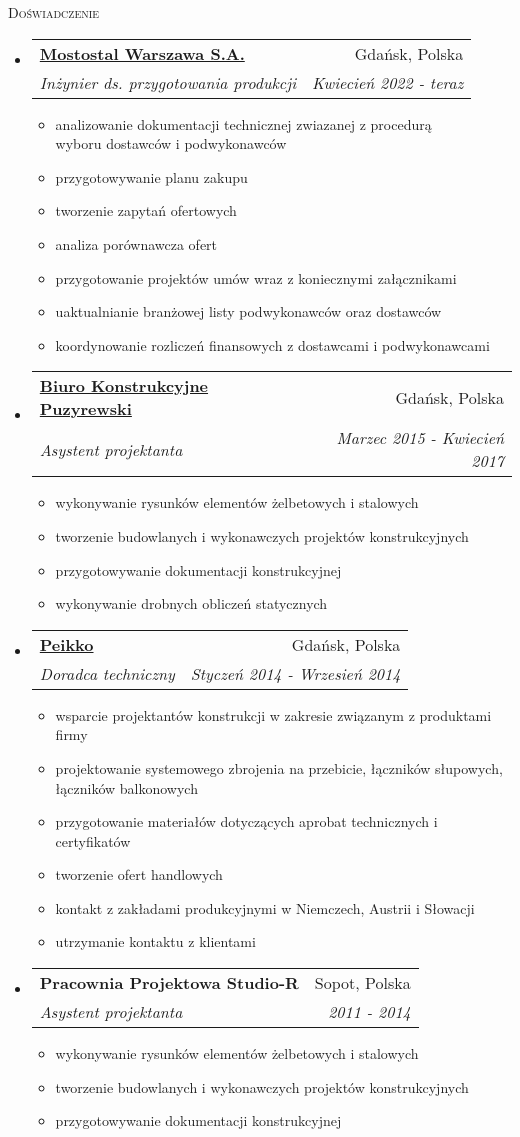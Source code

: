 \documentclass[letterpaper,11pt]{article}
\makeatletter
\newcommand{\resheading}[1]{
  \begin{tcolorbox}
  \textsc{#1}
  \end{tcolorbox}
}
\newcommand{\resitem}[1]{\item #1 \vspace{-2pt}}
\newcommand{\ressubheading}[4]{
\begin{tabular*}{6.5in}{l@{\extracolsep{\fill}}r}
		\textbf{#1} & #2 \\
		\textit{#3} & \textit{#4} \\
\end{tabular*}\vspace{-6pt}}
\makeatother
\begin{document}
\resheading{Doświadczenie}
\begin{itemize}

\item
  \ressubheading{\href{www.mostostal.waw.pl}{Mostostal Warszawa S.A.}}{Gdańsk, Polska}{Inżynier ds. przygotowania produkcji}{Kwiecień 2022 - teraz}
  \begin{itemize}
    \resitem{analizowanie dokumentacji technicznej zwiazanej z procedurą \\ wyboru dostawców i podwykonawców}
    \resitem{przygotowywanie planu zakupu}
    \resitem{tworzenie zapytań ofertowych}
    \resitem{analiza porównawcza ofert}
    \resitem{przygotowanie projektów umów wraz z koniecznymi załącznikami}
    \resitem{uaktualnianie branżowej listy podwykonawców oraz dostawców}
    \resitem{koordynowanie rozliczeń finansowych z dostawcami i podwykonawcami}
  \end{itemize}

\item
  \ressubheading{\href{www.puzyrewski.pl}{Biuro Konstrukcyjne Puzyrewski}}{Gdańsk, Polska}{Asystent projektanta}{Marzec 2015 - Kwiecień 2017}
  \begin{itemize}
    \resitem{wykonywanie rysunków elementów żelbetowych i stalowych}
    \resitem{tworzenie budowlanych i wykonawczych projektów konstrukcyjnych}
    \resitem{przygotowywanie dokumentacji konstrukcyjnej}
    \resitem{wykonywanie drobnych obliczeń statycznych}
  \end{itemize}

\item
  \ressubheading{\href{www.peikko.pl}{Peikko}}{Gdańsk, Polska}{Doradca techniczny}{Styczeń 2014 - Wrzesień 2014}
  \begin{itemize}
    \resitem{wsparcie projektantów konstrukcji w zakresie związanym z produktami firmy}
    \resitem{projektowanie systemowego zbrojenia na przebicie, łączników słupowych, łączników balkonowych}
    \resitem{przygotowanie materiałów dotyczących aprobat technicznych i certyfikatów}
    \resitem{tworzenie ofert handlowych}
    \resitem{kontakt z zakładami produkcyjnymi w Niemczech, Austrii i Słowacji}
    \resitem{utrzymanie kontaktu z klientami}
  \end{itemize}

\item 
  \ressubheading{Pracownia Projektowa Studio-R}{Sopot, Polska}{Asystent projektanta}{2011 - 2014}
  \begin{itemize}
    \resitem{wykonywanie rysunków elementów żelbetowych i stalowych}
    \resitem{tworzenie budowlanych i wykonawczych projektów konstrukcyjnych}
    \resitem{przygotowywanie dokumentacji konstrukcyjnej}
  \end{itemize}
  

\end{itemize}
\end{document}

